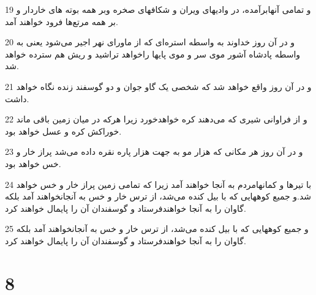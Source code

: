 \par 19 و تمامی آنهابرآمده، در وادیهای ویران و شکافهای صخره وبر همه بوته های خاردار و بر همه مرتع‌ها فرود خواهند آمد.
\par 20 و در آن روز خداوند به واسطه استره‌ای که از ماورای نهر اجیر می‌شود یعنی به واسطه پادشاه آشور موی سر و موی پایها راخواهد تراشید و ریش هم سترده خواهد شد.
\par 21 و در آن روز واقع خواهد شد که شخصی یک گاو جوان و دو گوسفند زنده نگاه خواهد داشت.
\par 22 و از فراوانی شیری که می‌دهند کره خواهدخورد زیرا هرکه در میان زمین باقی ماند خوراکش کره و عسل خواهد بود.
\par 23 و در آن روز هر مکانی که هزار مو به جهت هزار پاره نقره داده می‌شد پراز خار و خس خواهد بود.
\par 24 با تیرها و کمانهامردم به آنجا خواهند آمد زیرا که تمامی زمین پراز خار و خس خواهد شد.و جمیع کوههایی که با بیل کنده می‌شد، از ترس خار و خس به آنجانخواهند آمد بلکه گاوان را به آنجا خواهندفرستاد و گوسفندان آن را پایمال خواهند کرد.
\par 25 و جمیع کوههایی که با بیل کنده می‌شد، از ترس خار و خس به آنجانخواهند آمد بلکه گاوان را به آنجا خواهندفرستاد و گوسفندان آن را پایمال خواهند کرد.
 
\chapter{8}

